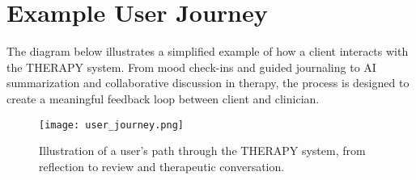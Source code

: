 \section*{Example User Journey}

The diagram below illustrates a simplified example of how a client interacts with the THERAPY system. From mood check-ins and guided journaling to AI summarization and collaborative discussion in therapy, the process is designed to create a meaningful feedback loop between client and clinician.

\begin{figure}[H]
  \centering
  \texttt{[image: user\_journey.png]}
  \caption{Illustration of a user’s path through the THERAPY system, from reflection to review and therapeutic conversation.}
\end{figure}
